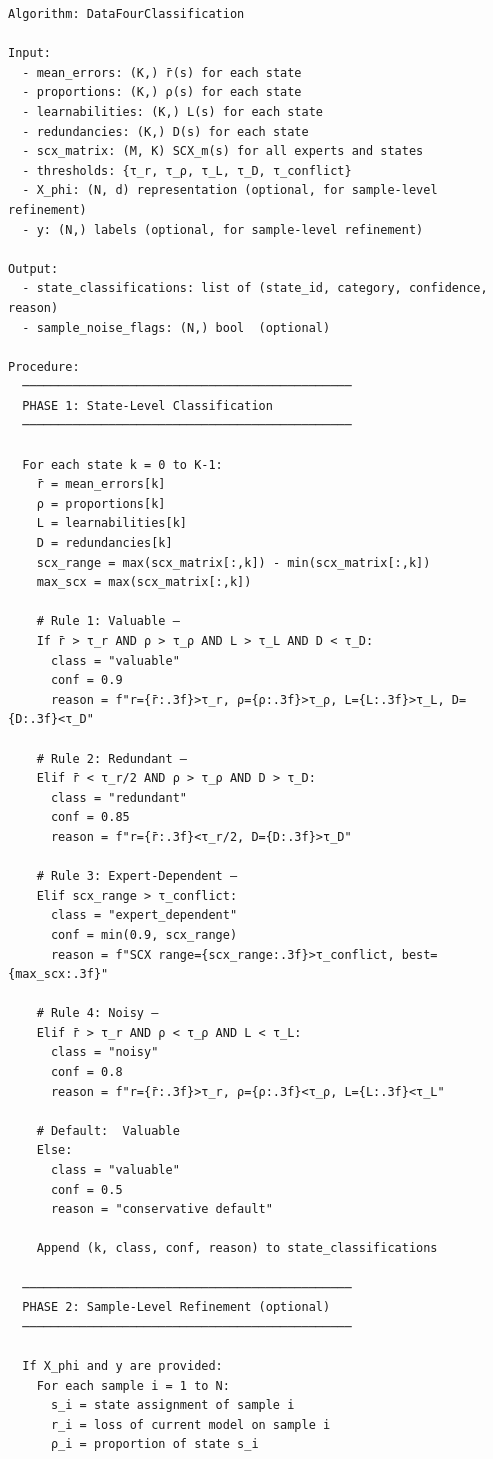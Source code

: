 \documentclass[
  12pt,
]{article}
\begin{document}
\begin{verbatim}
Algorithm: DataFourClassification

Input:
  - mean_errors: (K,) r̄(s) for each state
  - proportions: (K,) ρ(s) for each state
  - learnabilities: (K,) L(s) for each state
  - redundancies: (K,) D(s) for each state
  - scx_matrix: (M, K) SCX_m(s) for all experts and states
  - thresholds: {τ_r, τ_ρ, τ_L, τ_D, τ_conflict}
  - X_phi: (N, d) representation (optional, for sample-level refinement)
  - y: (N,) labels (optional, for sample-level refinement)

Output:
  - state_classifications: list of (state_id, category, confidence, reason)
  - sample_noise_flags: (N,) bool  (optional)

Procedure:
  ──────────────────────────────────────────────
  PHASE 1: State-Level Classification
  ──────────────────────────────────────────────

  For each state k = 0 to K-1:
    r̄ = mean_errors[k]
    ρ = proportions[k]
    L = learnabilities[k]
    D = redundancies[k]
    scx_range = max(scx_matrix[:,k]) - min(scx_matrix[:,k])
    max_scx = max(scx_matrix[:,k])

    # Rule 1: Valuable — 
    If r̄ > τ_r AND ρ > τ_ρ AND L > τ_L AND D < τ_D:
      class = "valuable"
      conf = 0.9
      reason = f"r={r̄:.3f}>τ_r, ρ={ρ:.3f}>τ_ρ, L={L:.3f}>τ_L, D={D:.3f}<τ_D"

    # Rule 2: Redundant — 
    Elif r̄ < τ_r/2 AND ρ > τ_ρ AND D > τ_D:
      class = "redundant"
      conf = 0.85
      reason = f"r={r̄:.3f}<τ_r/2, D={D:.3f}>τ_D"

    # Rule 3: Expert-Dependent — 
    Elif scx_range > τ_conflict:
      class = "expert_dependent"
      conf = min(0.9, scx_range)
      reason = f"SCX range={scx_range:.3f}>τ_conflict, best={max_scx:.3f}"

    # Rule 4: Noisy — 
    Elif r̄ > τ_r AND ρ < τ_ρ AND L < τ_L:
      class = "noisy"
      conf = 0.8
      reason = f"r={r̄:.3f}>τ_r, ρ={ρ:.3f}<τ_ρ, L={L:.3f}<τ_L"

    # Default:  Valuable
    Else:
      class = "valuable"
      conf = 0.5
      reason = "conservative default"

    Append (k, class, conf, reason) to state_classifications

  ──────────────────────────────────────────────
  PHASE 2: Sample-Level Refinement (optional)
  ──────────────────────────────────────────────

  If X_phi and y are provided:
    For each sample i = 1 to N:
      s_i = state assignment of sample i
      r_i = loss of current model on sample i
      ρ_i = proportion of state s_i


\end{verbatim}
\end{document}

